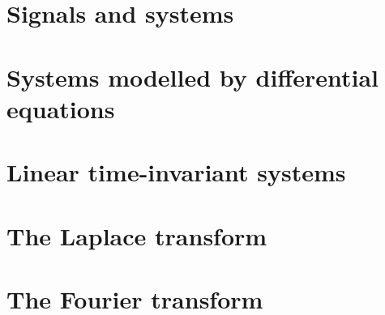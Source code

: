 \documentclass[11pt,a4paper]{book}
\title{\mytitle}
\author{Robby McKilliam}
\theoremstyle{plain}
\numberwithin{equation}{section}
\begin{document}
\frontmatter
\pagestyle{front}
\maketitle

\setcounter{tocdepth}{1}

\tableofcontents
  
\mainmatter
\pagestyle{main}

\chapter{Signals and systems}
 

\chapter{Systems modelled by differential equations}
 

\chapter{Linear time-invariant systems}
 

\chapter{The Laplace transform} 
 

\chapter{The Fourier transform}
 

%  




\pagestyle{back}


\end{document}
